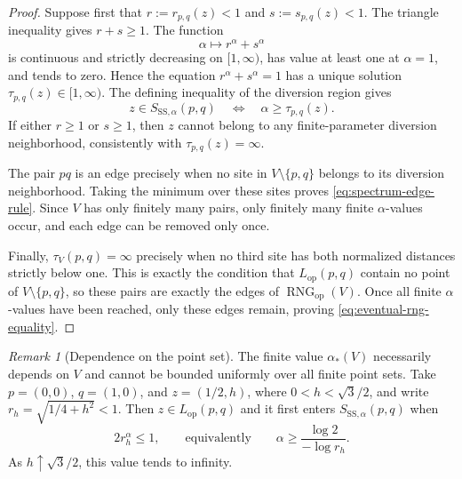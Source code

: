 \documentclass[a4paper,fleqn]{cas-sc}
\theoremstyle{definition}
\theoremstyle{remark}
\newtheorem{remark}{Remark}
\newcommand{\0}{\mathbf{0}}
\newcommand{\tr}[1]{#1}
\newcommand{\tr}[1]{\textcolor[HTML]{aa0000}{#1}}
\DeclareMathOperator{\RNG}{RNG}
\begin{document}
\begin{proof}
\tr{Suppose first that $r:=r_{p,q}(z)<1$ and $s:=s_{p,q}(z)<1$.
The triangle inequality gives $r+s\geq1$. The function}
\begin{equation}
\tr{
\alpha\longmapsto r^\alpha+s^\alpha
}
\end{equation}
\tr{is continuous and strictly decreasing on $[1,\infty)$, has value at
least one at $\alpha=1$, and tends to zero. Hence the equation
$r^\alpha+s^\alpha=1$ has a unique solution
$\tau_{p,q}(z)\in[1,\infty)$. The defining inequality of the diversion
region gives}
\begin{equation}
\tr{
z\in S_{\mathrm{SS},\alpha}(p,q)
\quad\Longleftrightarrow\quad
\alpha\geq\tau_{p,q}(z).
}
\end{equation}
\tr{If either $r\geq1$ or $s\geq1$, then $z$ cannot belong to any
finite-parameter diversion neighborhood, consistently with
$\tau_{p,q}(z)=\infty$.}

\tr{The pair $pq$ is an edge precisely when no site in
$V\setminus\{p,q\}$ belongs to its diversion neighborhood. Taking the minimum
over these sites proves \eqref{eq:spectrum-edge-rule}. Since $V$ has only
finitely many pairs, only finitely many finite $\alpha$-values occur, and
each edge can be removed only once.}

\tr{Finally, $\tau_V(p,q)=\infty$ precisely when no third site has both
normalized distances strictly below one. This is exactly the condition that
$L_{\mathrm{op}}(p,q)$ contain no point of $V\setminus\{p,q\}$, so these
pairs are exactly the edges of $\RNG_{\mathrm{op}}(V)$. Once all finite
$\alpha$-values have been reached, only these edges remain, proving
\eqref{eq:eventual-rng-equality}.}
\end{proof}

\begin{remark}[Dependence on the point set]
\tr{The finite value $\alpha_*(V)$ necessarily depends on $V$ and
cannot be bounded uniformly over all finite point sets. Take
$p=(0,0)$, $q=(1,0)$, and $z=(1/2,h)$, where
$0<h<\sqrt3/2$, and write $r_h=\sqrt{1/4+h^2}<1$. Then
$z\in L_{\mathrm{op}}(p,q)$ and it first enters
$S_{\mathrm{SS},\alpha}(p,q)$ when}
\begin{equation}
\tr{
2r_h^\alpha\leq1,
\qquad\text{equivalently}\qquad
\alpha\geq\frac{\log2}{-\log r_h}.
}
\end{equation}
\tr{As $h\uparrow\sqrt3/2$, this value tends to infinity.}
\end{remark}

\endgroup
\clearpage
\end{document}
